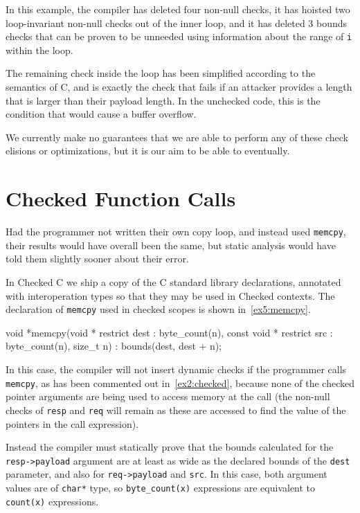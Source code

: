 In this example, the compiler has deleted four non-null checks, it has
hoisted two loop-invariant non-null checks out of the inner loop, and
it has deleted 3 bounds checks that can be proven to be unneeded using
information about the range of \lstinline|i| within the loop.

The remaining check inside the loop has been simplified according to
the semantics of C, and is exactly the check that fails if an attacker
provides a length that is larger than their payload length. In the
unchecked code, this is the condition that would cause a buffer
overflow.

We currently make no guarantees that we are able to perform any of
these check elisions or optimizations, but it is our aim to be able to
eventually.

\section{Checked Function Calls}
\label{sec:check-funct-calls}

Had the programmer not written their own copy loop, and instead used
\lstinline|memcpy|, their results would have overall been the same,
but static analysis would have told them slightly sooner about their
error.

In Checked C we ship a copy of the C standard library declarations, annotated with interoperation types so that they may be used in Checked contexts. The declaration of \lstinline|memcpy| used in checked scopes is shown in~\autoref{ex5:memcpy}.

\begin{code}[label=ex5:memcpy,float=ht,caption={Checked Type of \texttt{memcpy}}]
void *memcpy(void * restrict dest : byte_count(n), 
             const void * restrict src : byte_count(n), 
             size_t n)
             : bounds(dest, dest + n);
\end{code}

In this case, the compiler will not insert dynamic checks if the
programmer calls \lstinline|memcpy|, as has been commented out
in~\autoref{ex2:checked}, because none of the checked pointer
arguments are being used to access memory at the call (the non-null
checks of \lstinline|resp| and \lstinline|req| will remain as these
are accessed to find the value of the pointers in the call
expression).

Instead the compiler must statically prove that the bounds calculated
for the \lstinline|resp->payload| argument are at least as wide as the
declared bounds of the \lstinline|dest| parameter, and also for
\lstinline|req->payload| and \lstinline|src|. In this case, both
argument values are of \lstinline|char*| type, so
\lstinline|byte_count(x)| expressions are equivalent to
\lstinline|count(x)| expressions.

